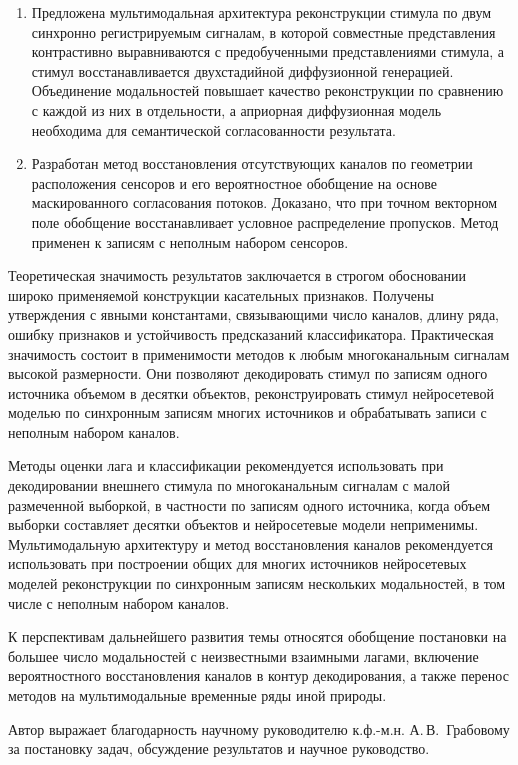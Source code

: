 \begin{enumerate}
    \item Предложена мультимодальная архитектура реконструкции стимула по двум синхронно регистрируемым сигналам, в которой совместные представления контрастивно выравниваются с предобученными представлениями стимула, а стимул восстанавливается двухстадийной диффузионной генерацией. Объединение модальностей повышает качество реконструкции по сравнению с каждой из них в отдельности, а априорная диффузионная модель необходима для семантической согласованности результата.
    \item Разработан метод восстановления отсутствующих каналов по геометрии расположения сенсоров и его вероятностное обобщение на основе маскированного согласования потоков. Доказано, что при точном векторном поле обобщение восстанавливает условное распределение пропусков. Метод применен к записям с неполным набором сенсоров.
\end{enumerate}

\ifsynopsis\else Теоретическая значимость результатов заключается в строгом обосновании широко применяемой конструкции касательных признаков. Получены утверждения с явными константами, связывающими число каналов, длину ряда, ошибку признаков и устойчивость предсказаний классификатора. Практическая значимость состоит в применимости методов к любым многоканальным сигналам высокой размерности. Они позволяют декодировать стимул по записям одного источника объемом в десятки объектов, реконструировать стимул нейросетевой моделью по синхронным записям многих источников и обрабатывать записи с неполным набором каналов.\fi

Методы оценки лага и классификации рекомендуется использовать при декодировании внешнего стимула по многоканальным сигналам с малой размеченной выборкой, в частности по записям одного источника, когда объем выборки составляет десятки объектов и нейросетевые модели неприменимы. Мультимодальную архитектуру и метод восстановления каналов рекомендуется использовать при построении общих для многих источников нейросетевых моделей реконструкции по синхронным записям нескольких модальностей, в том числе с неполным набором каналов.

К перспективам дальнейшего развития темы относятся обобщение постановки на большее число модальностей с неизвестными взаимными лагами, включение вероятностного восстановления каналов в контур декодирования, а также перенос методов на мультимодальные временные ряды иной природы.

Автор выражает благодарность научному руководителю к.ф.-м.н. А.\,В.~Грабовому за постановку задач, обсуждение результатов и научное руководство.
